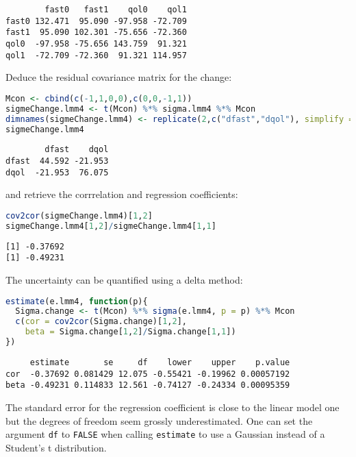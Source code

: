 \documentclass[12pt]{article}
\begin{document}
\label{}
\begin{verbatim}
        fast0   fast1    qol0    qol1
fast0 132.471  95.090 -97.958 -72.709
fast1  95.090 102.301 -75.656 -72.360
qol0  -97.958 -75.656 143.759  91.321
qol1  -72.709 -72.360  91.321 114.957
\end{verbatim}


Deduce the residual covariance matrix for the change:
\begin{lstlisting}[language=r,numbers=none]
Mcon <- cbind(c(-1,1,0,0),c(0,0,-1,1))
sigmeChange.lmm4 <- t(Mcon) %*% sigma.lmm4 %*% Mcon
dimnames(sigmeChange.lmm4) <- replicate(2,c("dfast","dqol"), simplify = FALSE)
sigmeChange.lmm4
\end{lstlisting}

\label{}
\begin{verbatim}
        dfast    dqol
dfast  44.592 -21.953
dqol  -21.953  76.075
\end{verbatim}


and retrieve the corrrelation and regression coefficients:
\begin{lstlisting}[language=r,numbers=none]
cov2cor(sigmeChange.lmm4)[1,2]
sigmeChange.lmm4[1,2]/sigmeChange.lmm4[1,1]
\end{lstlisting}

\label{}
\begin{verbatim}
[1] -0.37692
[1] -0.49231
\end{verbatim}


The uncertainty can be quantified using a delta method:
\begin{lstlisting}[language=r,numbers=none]
estimate(e.lmm4, function(p){
  Sigma.change <- t(Mcon) %*% sigma(e.lmm4, p = p) %*% Mcon
  c(cor = cov2cor(Sigma.change)[1,2],
    beta = Sigma.change[1,2]/Sigma.change[1,1])
})
\end{lstlisting}

\label{}
\begin{verbatim}
     estimate       se     df    lower    upper    p.value
cor  -0.37692 0.081429 12.075 -0.55421 -0.19962 0.00057192
beta -0.49231 0.114833 12.561 -0.74127 -0.24334 0.00095359
\end{verbatim}


The standard error for the regression coefficient is close to the
linear model one but the degrees of freedom seem grossly
underestimated. One can set the argument \texttt{df} to \texttt{FALSE} when calling
\texttt{estimate} to use a Gaussian instead of a Student's t distribution.
\end{document}
